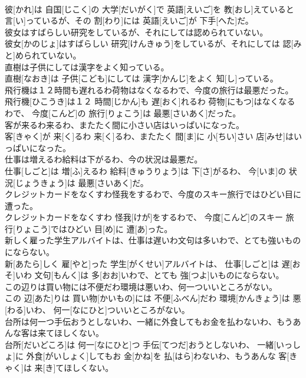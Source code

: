 \documentclass[8pt]{extreport}
\begin{document}
\begin{CJK}{UTF8}{min}
\\	彼[かれ]は 自国[じこく]の 大学[だいがく]で 英語[えいご]を 教[おし]えていると 言[い]っているが、その 割[わり]には 英語[えいご]が 下手[へた]だ。
\\	彼女はすばらしい研究をしているが、それにしては認められていない。	
\\	彼女[かのじょ]はすばらしい 研究[けんきゅう]をしているが、それにしては 認[みと]められていない。
\\	直樹は子供にしては漢字をよく知っている。	
\\	直樹[なおき]は 子供[こども]にしては 漢字[かんじ]をよく 知[し]っている。
\\	飛行機は１２時間も遅れるわ荷物はなくなるわで、今度の旅行は最悪だった。	
\\	飛行機[ひこうき]は１２ 時間[じかん]も 遅[おく]れるわ 荷物[にもつ]はなくなるわで、 今度[こんど]の 旅行[りょこう]は 最悪[さいあく]だった。
\\	客が来るわ来るわ、またたく間に小さい店はいっぱいになった。	
\\	客[きゃく]が 来[く]るわ 来[く]るわ、またたく 間[ま]に 小[ちい]さい 店[みせ]はいっぱいになった。
\\	仕事は増えるわ給料は下がるわ、今の状況は最悪だ。	
\\	仕事[しごと]は 増[ふ]えるわ 給料[きゅうりょう]は 下[さ]がるわ、 今[いま]の 状況[じょうきょう]は 最悪[さいあく]だ。
\\	クレジットカードをなくすわ怪我をするわで、今度のスキー旅行ではひどい目に遭った。	
\\	クレジットカードをなくすわ 怪我[けが]をするわで、 今度[こんど]のスキー 旅行[りょこう]ではひどい 目[め]に 遭[あ]った。
\\	新しく雇った学生アルバイトは、仕事は遅いわ文句は多いわで、とても強いものにならない。	
\\	新[あたら]しく 雇[やと]った 学生[がくせい]アルバイトは、 仕事[しごと]は 遅[おそ]いわ 文句[もんく]は 多[おお]いわで、とても 強[つよ]いものにならない。
\\	この辺りは買い物には不便だわ環境は悪いわ、何一ついいところがない。	
\\	この 辺[あた]りは 買い物[かいもの]には 不便[ふべん]だわ 環境[かんきょう]は 悪[わる]いわ、 何一[なにひと]ついいところがない。
\\	台所は何一つ手伝おうとしないわ、一緒に外食してもお金を払わないわ、もうあんな客は来てほしくない。	
\\	台所[だいどころ]は 何一[なにひと]つ 手伝[てつだ]おうとしないわ、 一緒[いっしょ]に 外食[がいしょく]してもお 金[かね]を 払[はら]わないわ、もうあんな 客[きゃく]は 来[き]てほしくない。

\end{CJK}
\end{document}
